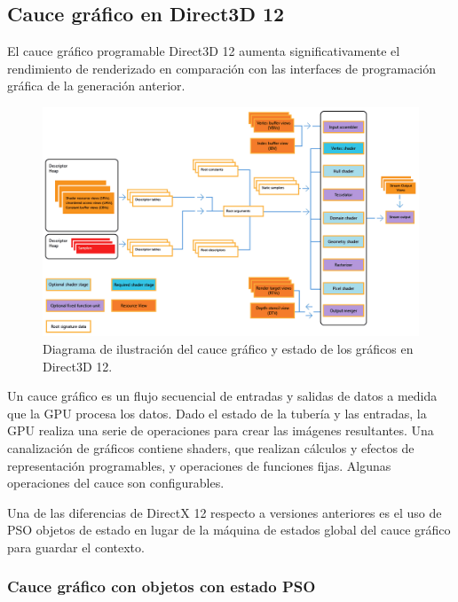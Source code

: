 \documentclass[a4paper, 17pt]{book}
\begin{document}
\subsection{Cauce gráfico en Direct3D 12} 
\label{subsec:CauceDX12}

El cauce gráfico programable Direct3D 12 aumenta significativamente el rendimiento de renderizado en comparación
con las interfaces de programación gráfica de la generación anterior.

\begin{figure}[H]
    \centering
    \includegraphics[scale=0.40, keepaspectratio]{img/pipelined123d.png}
    \caption{Diagrama de ilustración del cauce gráfico y estado de los gráficos en Direct3D 12.}
    \label{figura:khronos}
\end{figure}

Un cauce gráfico es un flujo secuencial de entradas y salidas de datos a medida que la GPU procesa los datos.
Dado el estado de la tubería y las entradas, la GPU realiza una serie de operaciones para crear las imágenes resultantes.
Una canalización de gráficos contiene shaders, que realizan cálculos y efectos de representación programables, y operaciones
de funciones fijas. Algunas operaciones del cauce son configurables. 

\vspace{1mm} %

Una de las diferencias de DirectX 12 respecto a versiones anteriores es el uso de PSO objetos de estado en lugar de la
máquina de estados global del cauce gráfico para guardar el contexto.

\subsubsection{Cauce gráfico con objetos con estado PSO} 
\label{subsubsec:PSO}
\end{document}
